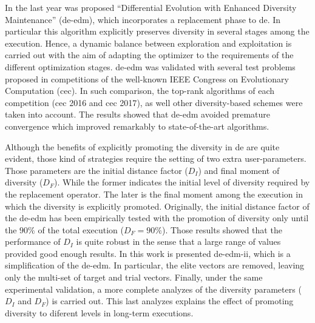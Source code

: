 \documentclass[a4paper,12pt]{article}
\newcommand{\DE}{{\sc de}}
\newcommand{\DEEDM}{{\sc de-edm}}
\newcommand{\DEEDMB}{{\sc de-edm-ii}}
\newcommand{\CEC}{{\sc cec}}
\newcommand{\CECA}{{\sc cec 2016}}
\newcommand{\CECB}{{\sc cec 2017}}
\begin{document}
In the last year was proposed ``Differential Evolution with Enhanced Diversity Maintenance'' (\DEEDM{}), which incorporates a replacement phase to \DE{}.
%
In particular this algorithm explicitly preserves diversity in several stages among the execution.
%
Hence, a dynamic balance between exploration and exploitation is carried out with the aim of adapting the optimizer to the requirements of the different optimization stages.
%
\DEEDM{} was validated with several test problems proposed in competitions of the well-known IEEE Congress on Evolutionary Computation (\CEC{}).
%
In such comparison, the top-rank algorithms of each competition (\CECA{} and \CECB{}), as well other diversity-based schemes were taken into account.
%
The results showed that \DEEDM{} avoided premature convergence which improved remarkably to state-of-the-art algorithms.
%

Although the benefits of explicitly promoting the diversity in \DE{} are quite evident, those kind of strategies require the setting of two extra user-parameters.
%
Those parameters are the initial distance factor ($D_I$) and final moment of diversity ($D_F$).
%
While the former indicates the initial level of diversity required by the replacement operator.
%
The later is the final moment among the execution in which the diversity is explicitly promoted.
%
Originally, the initial distance factor of the \DEEDM{} has been empirically tested with the promotion of diversity only until the $90\%$ of the total execution ($D_F=90\%$).
%
Those results showed that the performance of $D_I$ is quite robust in the sense that a large range of values provided good enough results.
%
In this work is presented \DEEDMB{}, which is a simplification of the \DEEDM{}.
%
In particular, the elite vectors are removed, leaving only the multi-set of target and trial vectors.
%
Finally, under the same experimental validation, a more complete analyzes of the diversity parameters ($D_I$ and $D_F$) is carried out.
%
This last analyzes explains the effect of promoting diversity to diferent levels in long-term executions.
%


% 
% 


\end{document}
